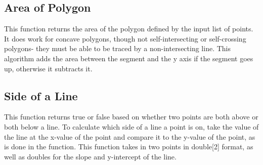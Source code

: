 \subsection{Area of Polygon}
This function returns the area of the polygon defined by the input list of points. It does work for concave polygons, though not self-intersecting or self-crossing polygons- they must be able to be traced by a non-intersecting line. This algorithm adds the area between the segment and the y axis if the segment goes up, otherwise it subtracts it.


\subsection{Side of a Line}
This function returns true or false based on whether two points are both above or both below a line. To calculate which side of a line a point is on, take the value of the line at the x-value of the point and compare it to the y-value of the point, as is done in the function. This function takes in two points in double[2] format, as well as doubles for the slope and y-intercept of the line.

